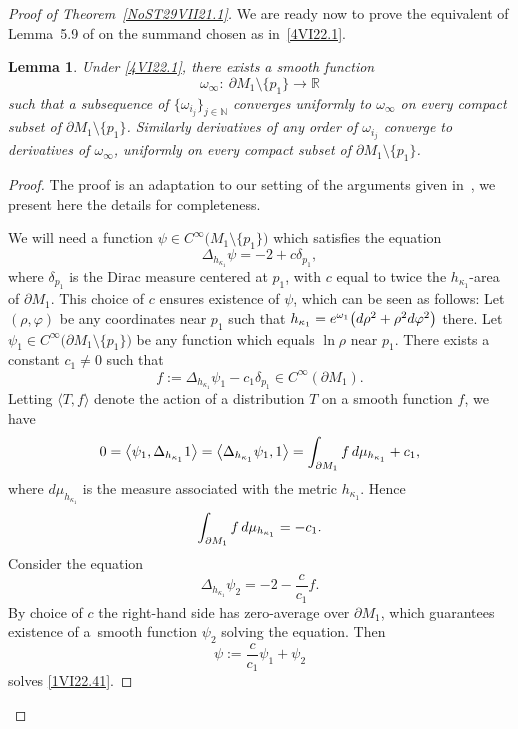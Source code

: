 \documentclass[10pt,a4paper]{article}
\numberwithin{equation}{section}
\newtheorem{Lemma}[Theorem]{Lemma}
\newcommand{\mv}{\omega}%
\newcommand{\N}{\mathbb N}
\newcommand{\R}{\mathbb R}
\begin{document}
\begin{proof}[Proof of Theorem~\ref{NoST29VII21.1}]
We are ready now to prove the equivalent of Lemma~5.9 of \cite{CDW} on the summand chosen as in~\eqref{4VI22.1}.

\begin{Lemma} \label{NoSL23X21.2}
Under \eqref{4VI22.1}, there exists a smooth function
\[
 \mv_\infty\colon \ \partial M_1\setminus \{p_1\} \to \R
\]
such that a subsequence of $\{\mv_{i_j}\}_{j\in\N}$ converges uniformly to $\mv_\infty$ on every compact subset of $\partial M_1\setminus \{p_1\}$.
Similarly derivatives of any order of $\mv_{i_j}$ converge to derivatives of $\mv_\infty$, uniformly on every compact subset of $\partial M_1\setminus \{p_1\}$.
\end{Lemma}

\begin{proof}
The proof is an adaptation to our setting of the arguments given in~\cite{CDW}, we present here the details for completeness.

We will need a function $\psi\in C^\infty\big(M_1\setminus \{p_1\}\big)$ which satisfies the equation
\begin{equation}\label{1VI22.41}
 \Delta_{h_{\kappa_1}} \psi = -2 + c \delta_{p_1},
\end{equation}
where $\delta_{p_1}$ is the Dirac measure centered at $p_1$, with $c$ equal to twice the $h_{\kappa_1}$-area of $\partial M_1$. This choice of $c$ ensures existence of $\psi$, which can be seen as follows:
Let $(\rho,\varphi)$ be any coordinates near $p_1$ such that $h_{\kappa_1} = {\rm e}^{\omega_1}\big( {\rm d}\rho^2 + \rho^2 {\rm d}\varphi^2\big)$ there. Let $\psi_1\in C^\infty\big(\partial M_1\setminus \{p_1\}\big)$ be any function which equals $\ln \rho$ near $p_1$. There exists a constant $c_1\ne 0 $ such
that
%
\[
f:= \Delta_{h_{\kappa_1}} \psi_1 -c_1 \delta_{p_1}\in C^\infty(\partial M_1).
\]
Letting $\langle T,f\rangle$ denote the action of a distribution $T$ on a smooth function $f$, we have
\begin{equation*}%
 0 = \big\langle \psi_1, \Delta_{h_{\kappa_1}} 1\big\rangle
 = \big\langle \Delta_{h_{\kappa_1}} \psi_1, 1\big\rangle
 = \int_{\partial M_1} f \, {\rm d}\mu_{h_{\kappa_1} } + c_1,
\end{equation*}
where $d\mu_{h_{\kappa_1} }$ is the measure associated with the metric ${h_{\kappa_1} }$.
Hence
\begin{equation*}%
 \int_{\partial M_1} f \, {\rm d}\mu_{h_{\kappa_1} } = -c_1.
\end{equation*}
Consider the equation
\begin{equation*}%
 \Delta_{h_{\kappa_1}} \psi_2 = -2 -\frac{c}{c_1} f.
\end{equation*}
By choice of $c$ the right-hand side has zero-average over $\partial M_1$, which guarantees existence of a~smooth function $\psi_2$ solving the equation. Then{\samepage
\begin{equation*}%
 \psi := \frac{c}{c_1} \psi_1 + \psi_2
\end{equation*}
solves \eqref{1VI22.41}.}


\end{proof}
\end{proof}
\end{document}
